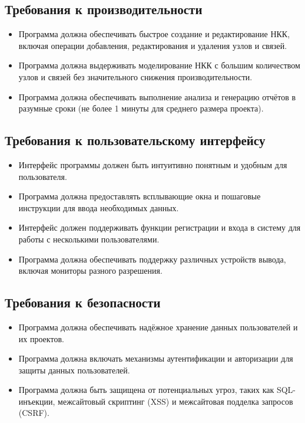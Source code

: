\documentclass{article}
\begin{document}
    \subsection{Требования к производительности}

    \begin{itemize}
        \item Программа должна обеспечивать быстрое создание и редактирование НКК, включая операции добавления, редактирования и удаления узлов и связей.
        \item Программа должна выдерживать моделирование НКК с большим количеством узлов и связей без значительного снижения производительности.
        \item Программа должна обеспечивать выполнение анализа и генерацию отчётов в разумные сроки (не более 1 минуты для среднего размера проекта).
    \end{itemize}

    \subsection{Требования к пользовательскому интерфейсу}

    \begin{itemize}
        \item Интерфейс программы должен быть интуитивно понятным и удобным для пользователя.
        \item Программа должна предоставлять всплывающие окна и пошаговые инструкции для ввода необходимых данных.
        \item Интерфейс должен поддерживать функции регистрации и входа в систему для работы с несколькими пользователями.
        \item Программа должна обеспечивать поддержку различных устройств вывода, включая мониторы разного разрешения.
    \end{itemize}

    \subsection{Требования к безопасности}

    \begin{itemize}
        \item Программа должна обеспечивать надёжное хранение данных пользователей и их проектов.
        \item Программа должна включать механизмы аутентификации и авторизации для защиты данных пользователей.
        \item Программа должна быть защищена от потенциальных угроз, таких как SQL-инъекции, межсайтовый скриптинг (XSS) и межсайтовая подделка запросов (CSRF).
    \end{itemize}
\end{document}
